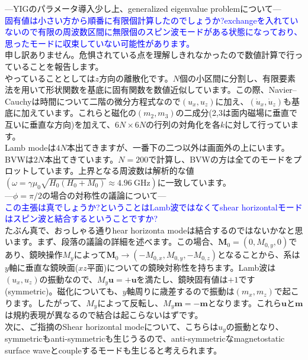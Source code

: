 \documentclass{jsarticle}
\begin{document}
---YIGのパラメータ導入少し上、generalized eigenvalue problemについて---\\
\textcolor{blue}{固有値は小さい方から順番に有限個計算したのでしょうか?exchangeを入れていないので有限の周波数区間に無限個のスピン波モードがある状態になっており、思ったモードに収束していない可能性があります。}\\

申し訳ありません。危惧されている点を理解しきれなかったので数値計算で行っていることを報告します。\\
やっていることとしては$z$方向の離散化です。$N$個の小区間に分割し、有限要素法を用いて形状関数を基底に固有関数を数値近似しています。この際、Navier--Cauchyは時間について二階の微分方程式なので$(u_x,u_z)$に加え、$(\dot{u}_x,\dot{u}_z)$も基底に加えています。これらと磁化の$(m_2,m_3)$の二成分(2,3は面内磁場に垂直で互いに垂直な方向)を加えて、$6N\times 6N$の行列の対角化を各$k$に対して行っています。\\

Lamb modeは$4N$本出てきますが、一番下の二つ以外は画面外の上にいます。BVWは$2N$本出てきています。$N=200$で計算し、BVWの方は全てのモードをプロットしています。上界となる周波数は解析的な値$(\omega=\gamma\mu_0\sqrt{H_0(H_0+M_0)}\approx 4.96 \mathrm{\ GHz})$に一致しています。\\

---$\phi=\pi/2$の場合の対称性の議論について---\\
\textcolor{blue}{この主張は真でしょうか?ということはLamb波ではなくてshear horizontalモードはスピン波と結合するということですか?}\\

たぶん真で、おっしゃる通りhear horizonta modeは結合するのではないかなと思います。まず、段落の議論の詳細を述べます。この場合、$\bm{M}_0=(0,M_{0,y},0)$であり、鏡映操作$M_y$によって$\bm{M}_0\to(-M_{0,x},M_{0,y},-M_{0,z})$となることから、系は$y$軸に垂直な鏡映面($xz$平面)についての鏡映対称性を持ちます。Lamb波は$(u_x,u_z)$の振動なので、$M_y\bm{u}=+\bm{u}$を満たし、鏡映固有値は$+1$です(symmetric)。磁化についても、$y$軸周りに歳差するので振動は$(m_x,m_z)$で起こります。したがって、$M_y$によって反転し、$M_y\bm{m}=-\bm{m}$となります。これら$\bm{u}$と$\bm{m}$は規約表現が異なるので結合は起こらないはずです。\\

次に、ご指摘のShear horizontal modeについて、こちらは$u_y$の振動となり、symmetricもanti-symmetricも生じうるので、anti-symmetricなmagnetostatic surface waveとcoupleするモードも生じると考えられます。\\
\end{document}
